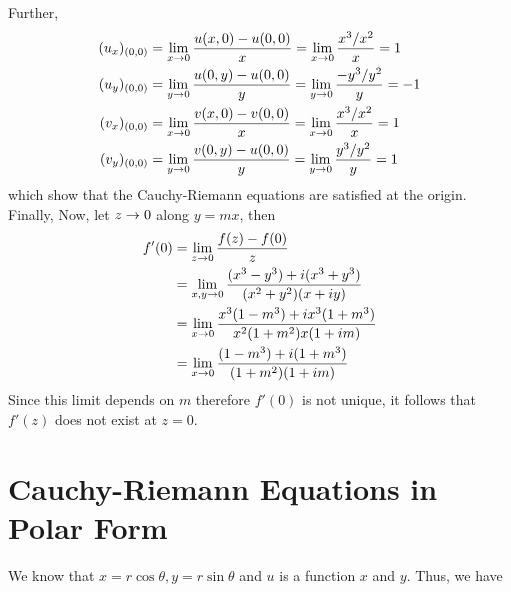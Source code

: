 \begin{solution}
Further,
\begin{align*}
        (u_x)_{(0,0)} &= \lim_{x \rightarrow 0} \frac{u(x,0) - u(0,0)}{x} = \lim_{x \rightarrow 0} \frac{x^3/x^2}{x} = 1 \\
        (u_y)_{(0,0)} &= \lim_{y \rightarrow 0} \frac{u(0,y) - u(0,0)}{y} = \lim_{y \rightarrow 0} \frac{-y^3/y^2}{y} = -1 \\
        (v_x)_{(0,0)} &= \lim_{x \rightarrow 0} \frac{v(x,0) - v(0,0)}{x} = \lim_{x \rightarrow 0} \frac{x^3/x^2}{x} = 1 \\
        (v_y)_{(0,0)} &= \lim_{y \rightarrow 0} \frac{v(0,y) - u(0,0)}{y} = \lim_{y \rightarrow 0} \frac{y^3/y^2}{y} = 1 
\end{align*}
which show that the Cauchy-Riemann equations are satisfied at the origin. Finally,
Now, let $z \rightarrow 0$ along $y=mx$, then
\begin{align*}
 f'(0) &= \lim_{z \rightarrow 0} \frac{f(z)-f(0)}{z} \\
  &= \lim_{x,y \rightarrow 0} \frac{(x^3-y^3)+i(x^3+y^3)}{(x^2+y^2)(x+iy)} \\
  &= \lim_{x \rightarrow 0} \frac{x^3(1-m^3)+ix^3(1+m^3)}{x^2(1+m^2)x(1+im)} \\
  &= \lim_{x \rightarrow 0} \frac{(1-m^3)+i(1+m^3)}{(1+m^2)(1+im)} \\
\end{align*}
Since this limit depends on $m$ therefore $f'(0)$ is not unique, it follows that $f'(z)$ does not exist at $z=0$.
\end{solution}

\section{Cauchy-Riemann Equations in Polar Form}
We know that $x=r\cos\theta,y=r\sin\theta$ and $u$ is a function
$x$ and $y$. Thus, we have 

